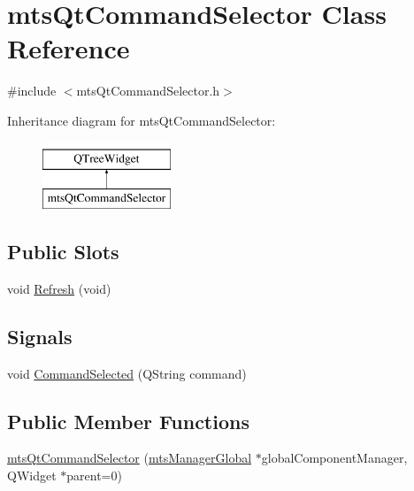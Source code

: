 \hypertarget{classmts_qt_command_selector}{\section{mts\-Qt\-Command\-Selector Class Reference}
\label{classmts_qt_command_selector}
}


{\ttfamily \#include $<$mts\-Qt\-Command\-Selector.\-h$>$}

Inheritance diagram for mts\-Qt\-Command\-Selector\-:\begin{figure}[H]
\begin{center}
\leavevmode
\includegraphics[height=2.000000cm]{db/db7/classmts_qt_command_selector}
\end{center}
\end{figure}
\subsection*{Public Slots}
\begin{DoxyCompactItemize}
\item 
void \hyperlink{classmts_qt_command_selector_aa168a80d09030ba728711a6358334dc8}{Refresh} (void)
\end{DoxyCompactItemize}
\subsection*{Signals}
\begin{DoxyCompactItemize}
\item 
void \hyperlink{classmts_qt_command_selector_aabecb88e0546b2b8d3ca21fa5a3e3c93}{Command\-Selected} (Q\-String command)
\end{DoxyCompactItemize}
\subsection*{Public Member Functions}
\begin{DoxyCompactItemize}
\item 
\hyperlink{classmts_qt_command_selector_a0789c7aa2bb0684c09bbadd34576081d}{mts\-Qt\-Command\-Selector} (\hyperlink{classmts_manager_global}{mts\-Manager\-Global} $\ast$global\-Component\-Manager, Q\-Widget $\ast$parent=0)
\end{DoxyCompactItemize}


